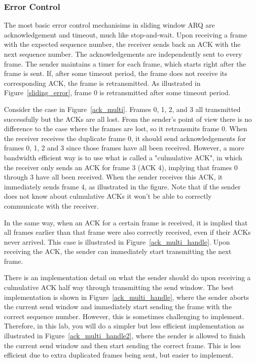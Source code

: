 \documentclass[11pt]{article}
\begin{document}
\subsubsection{Error Control}
The most basic error control mechanisims in sliding window ARQ are acknowledgement and timeout, much like stop-and-wait.
Upon receiving a frame with the expected sequence number, the receiver sends back an ACK with the next sequence number.
The acknowledgements are independently sent to every frame.
The sender maintains a timer for each frame, which starts right after the frame is sent.
If, after some timeout period, the frame does not receive its corresponding ACK, the frame is retransmitted.
As illustrated in Figure~\ref{sliding_error}, frame 0 is retransmitted after some timeout period.

Consider the case in Figure~\ref{ack_multi}. Frames 0, 1, 2, and 3 all transmitted successfully but the ACKs are all lost.
From the sender's point of view there is no difference to the case where the frames are lost, so it retransmits frame 0.
When the receiver receives the duplicate frame 0, it should send acknowledgements for frames 0, 1, 2 and 3 since those frames have all been received.
However, a more bandwidth efficient way is to use what is called a "culmulative ACK", in which the receiver only sends an ACK for frame 3 (ACK 4), implying that frames 0 through 3 have all been received.
When the sender receives this ACK, it immediately sends frame 4, as illustrated in the figure.
Note that if the sender does not know about culmulative ACKs it won't be able to correctly communicate with the receiver.

In the same way, when an ACK for a certain frame is received, it is implied that all frames earlier than that frame were also correctly received, even if their ACKs never arrived. This case is illustrated in Figure~\ref{ack_multi_handle}.
Upon receiving the ACK, the sender can immediately start transmitting the next frame.

There is an implementation detail on what the sender should do upon receiving a culmulative ACK half way through transmitting the send window.
The best implementation is shown in Figure~\ref{ack_multi_handle}, where the sender aborts the current send window and immediately start sending the frame with the correct sequence number.
However, this is sometimes challenging to implement.
Therefore, in this lab, you will do a simpler but less efficient implementation as illustrated in Figure~\ref{ack_multi_handle2}, where the sender is allowed to finish the current send window and then start sending the correct frame.
This is less efficient due to extra duplicated frames being sent, but easier to implement.
\end{document}

